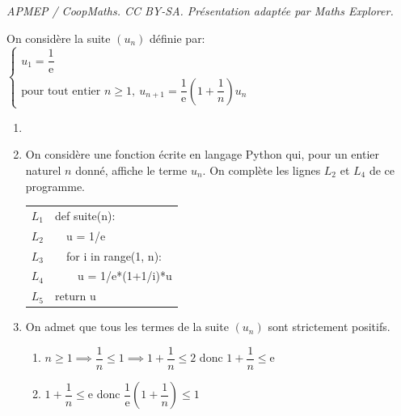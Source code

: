 \documentclass[10pt]{article}
\providecommand{\blue}{\color{blue}}
\providecommand{\e}{{\mathrm{e}}}
\providecommand{\blue}{\color{blue}}
\begin{document}
\noindent\textit{APMEP / CoopMaths. CC BY-SA. Présentation adaptée par Maths Explorer.}\par\medskip
\medskip

On considère la suite $\left(u_{n}\right)$ définie par: 
$\left\{
\begin{array}{l}
u_{1}=\dfrac{1}{\e} \\
\text{pour tout entier } n \geqslant 1,\: u_{n+1}=\dfrac{1}{\e}\left(1+\dfrac{1}{n}\right) u_{n}
\end{array}
\right.$

\begin{enumerate}
	\item 
{}

	\item On considère une fonction écrite en langage Python qui, pour un entier naturel $n$ donné, affiche le terme $u_{n}$. On complète les lignes $L_{2}$ et $L_{4}$ de ce programme.

	\begin{center}
		\begin{tabular}{|c|>{\ttfamily}l|}
			\hline
			$L_{1}$ & def suite(n): \\
			$L_{2}$ & ~~\blue u = 1/e \\
			$L_{3}$ & ~~for i in range(1, n): \\
			$L_{4}$ & ~~~~u = \blue 1/e*(1+1/i)*u\\
			$L_{5}$ & return u \\
			\hline
		\end{tabular}
	\end{center}

	\item On admet que tous les termes de la suite $\left(u_{n}\right)$ sont strictement positifs.
	\begin{enumerate}
		\item 
$n\geqslant 1 \implies \dfrac{1}{n}\leqslant 1 \implies 1+\dfrac{1}{n}\leqslant 2$ donc $1+\dfrac{1}{n}\leqslant \e$

		\item 
$1+\dfrac{1}{n}\leqslant \e$ donc $\dfrac{1}{\e} \left (1+\dfrac{1}{n}\right )\leqslant 1$


\end{enumerate}
\end{enumerate}
\end{document}
